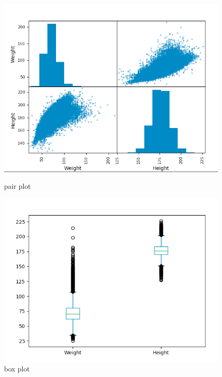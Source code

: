\documentclass{42-en}
\begin{document}
\begin{figure}[h!]
  \begin{minipage}[l]{0.49\linewidth}
    \includegraphics[scale=0.39]{assets/ex06_pair_plot.png}
    \caption{pair plot}
  \end{minipage}
  \hfill
  \begin{minipage}[c]{0.49\linewidth}
    \includegraphics[scale=0.39]{assets/ex06_box_plot.png}
    \caption{box plot}
  \end{minipage}  
\end{figure}



\newpage
\end{document}

